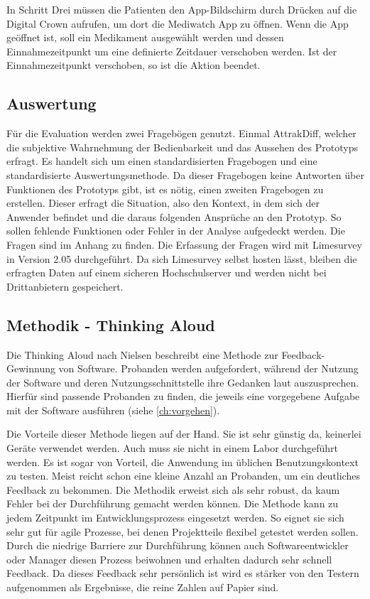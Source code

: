 In Schritt Drei müssen die Patienten den App-Bildschirm durch Drücken auf die Digital Crown aufrufen, um dort die Mediwatch App zu öffnen. Wenn die App geöffnet ist, soll ein Medikament ausgewählt werden und dessen Einnahmezeitpunkt um eine definierte Zeitdauer verschoben werden. Ist der Einnahmezeitpunkt verschoben, so ist die Aktion beendet.

\subsection{Auswertung}
Für die Evaluation werden zwei Fragebögen genutzt. Einmal AttrakDiff\cite{UserInDe:Attrakdiff}, welcher die subjektive  Wahrnehmung der Bedienbarkeit und das Aussehen des Prototyps erfragt. Es handelt sich um einen standardisierten Fragebogen und eine standardisierte Auswertungsmethode. Da dieser Fragebogen keine Antworten über Funktionen des Prototyps gibt, ist es nötig, einen zweiten Fragebogen zu erstellen. Dieser erfragt die Situation, also den Kontext, in dem sich der Anwender befindet und die daraus folgenden Ansprüche an den Prototyp. So sollen fehlende Funktionen oder Fehler in der Analyse aufgedeckt werden. Die Fragen sind im Anhang zu finden.
Die Erfassung der Fragen wird mit Limesurvey\cite{Limesurvey} in Version 2.05 durchgeführt. Da sich Limesurvey selbst hosten lässt, bleiben die erfragten Daten auf einem sicheren Hochschulserver und werden nicht bei Drittanbietern gespeichert. 

\subsection{Methodik - Thinking Aloud}
\label{ch:thinking}
Die Thinking Aloud nach Nielsen \cite{Nielsen:1993aa} beschreibt eine Methode zur Feedback-Gewinnung von Software. Probanden werden aufgefordert, während der Nutzung der Software und deren Nutzungsschnittstelle ihre Gedanken laut auszusprechen. Hierfür sind passende Probanden zu finden, die jeweils eine vorgegebene Aufgabe mit der Software ausführen (siehe \ref{ch:vorgehen}).

Die Vorteile dieser Methode liegen auf der Hand. Sie ist sehr günstig da, keinerlei Geräte verwendet werden. Auch muss sie nicht in einem Labor durchgeführt werden. Es ist sogar von Vorteil, die Anwendung im üblichen Benutzungskontext zu testen. Meist reicht schon eine kleine Anzahl an Probanden, um ein deutliches Feedback zu bekommen. Die Methodik erweist sich als sehr robust, da kaum Fehler bei der Durchführung gemacht werden können. Die Methode kann zu jedem Zeitpunkt im Entwicklungsprozess eingesetzt werden. So eignet sie sich sehr gut für agile Prozesse, bei denen Projektteile flexibel getestet werden sollen. Durch die niedrige Barriere zur Durchführung können auch Softwareentwickler oder Manager diesen Prozess beiwohnen und erhalten dadurch sehr schnell Feedback. Da dieses Feedback sehr persönlich ist wird es stärker von den Testern aufgenommen als Ergebnisse, die reine Zahlen auf Papier sind.

